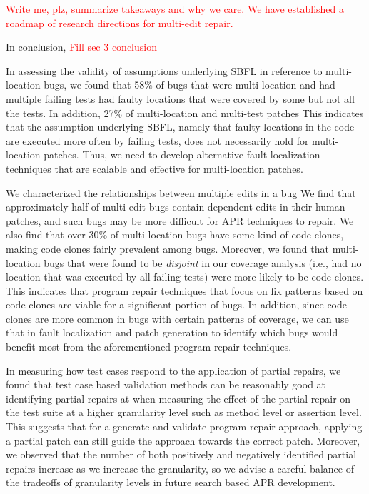 \documentclass[sigconf, timestamp-false, anonymous=true]{acmart}
\newcommand\todo[1]{\textcolor{red}{#1}}
\begin{document}
\todo{Write me, plz, summarize takeaways and why we care.  We have established a
  roadmap of research directions for multi-edit repair.}

In conclusion, \todo{Fill sec 3 conclusion}

In assessing the validity of assumptions underlying SBFL in reference to multi-location 
bugs, we found that 58\% of bugs that were multi-location and had multiple failing tests 
had faulty locations 
that were covered by some but not all the tests. In addition, 27\% of multi-location and 
multi-test patches  This indicates that the assumption underlying SBFL, namely that faulty 
locations in the code are executed more often by failing tests, does not necessarily hold 
for multi-location patches. Thus, we need to develop alternative fault localization 
techniques that are scalable and effective for multi-location patches.

We characterized the relationships between multiple edits in a bug
We find that approximately half of multi-edit bugs 
contain dependent edits in their human patches, and such bugs may be more 
difficult for APR techniques to repair.
We also find that over 30\%
of multi-location bugs have some kind of code clones, making code clones fairly prevalent 
among bugs. Moreover, we found that multi-location bugs that were found to be 
\emph{disjoint} in our coverage analysis (i.e., had no location that was executed by all 
failing tests) were more likely to be code clones. This indicates that program repair 
techniques that focus on fix patterns based on code clones are viable for a significant 
portion of bugs. In addition, since code clones are more common in bugs with certain 
patterns of coverage, we can use that in fault localization and patch generation to identify 
which bugs would benefit most from the aforementioned program repair techniques.

In measuring how test cases respond to the application of partial repairs, we found that 
test case based validation methods can be reasonably good at identifying partial
repairs at when measuring the effect of the partial repair on the test suite at a higher 
granularity level such as method level or assertion level. This suggests that for a generate 
and validate program repair approach, applying a partial patch can still guide the approach 
towards the correct patch. Moreover, 
we observed that the number of both positively and negatively identified partial repairs
increase as we increase the granularity, so we advise a careful balance of the tradeoffs of
granularity levels in future search based APR development.
\end{document}
